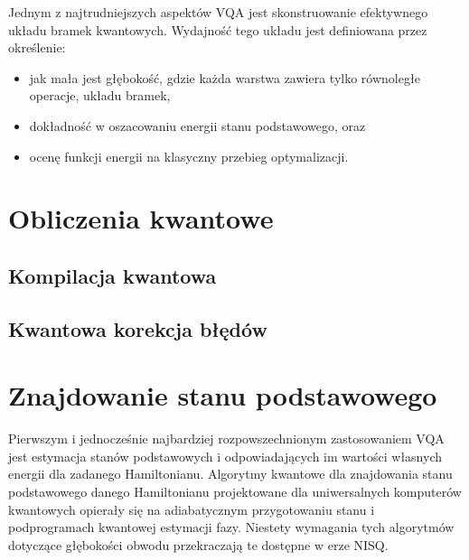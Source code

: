\documentclass[a4paper,11pt]{article}
\begin{document}
Jednym z najtrudniejszych aspektów VQA jest skonstruowanie efektywnego układu bramek kwantowych. Wydajność tego układu jest definiowana przez określenie:
\begin{itemize}
\item jak mała jest głębokość, gdzie każda warstwa zawiera tylko równoległe operacje, układu bramek, 
\item dokładność w oszacowaniu energii stanu podstawowego, oraz 
\item ocenę funkcji energii na klasyczny przebieg optymalizacji.
\end{itemize}




\newpage


\section{Obliczenia kwantowe}
\newpage
\subsection{Kompilacja kwantowa}
\newpage
\subsection{Kwantowa korekcja błędów}

\newpage
\section{Znajdowanie stanu podstawowego}

Pierwszym i jednocześnie najbardziej rozpowszechnionym zastosowaniem VQA jest estymacja stanów podstawowych i odpowiadających im wartości własnych energii dla zadanego Hamiltonianu. Algorytmy kwantowe dla znajdowania stanu podstawowego danego Hamiltonianu projektowane dla uniwersalnych komputerów kwantowych opierały się na adiabatycznym przygotowaniu stanu i podprogramach kwantowej estymacji fazy. Niestety wymagania tych algorytmów dotyczące głębokości obwodu przekraczają te dostępne w erze NISQ.
\end{document}
